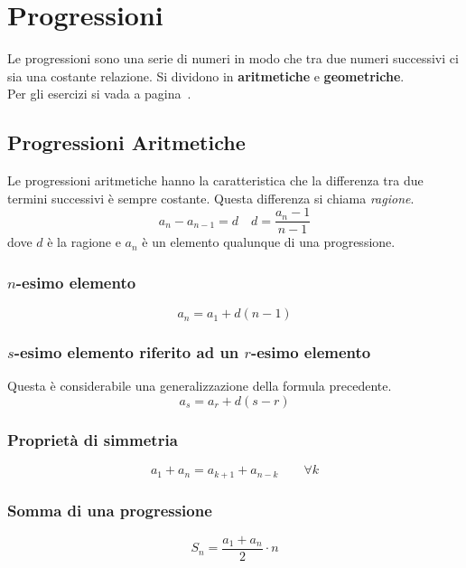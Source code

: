 
\section{Progressioni}\label{sec:progressioni}
Le progressioni sono una serie di numeri in modo che tra due numeri successivi ci sia una costante
relazione. Si dividono in \textbf{aritmetiche} e \textbf{geometriche}.\\
Per gli esercizi si vada a pagina~\pageref{ex:progressioni}.

\subsection{Progressioni Aritmetiche}
Le progressioni aritmetiche hanno la caratteristica che la differenza tra due termini successivi è
sempre costante. Questa differenza si chiama \emph{ragione}.
\begin{equation*}
a_n - a_{n-1} = d \quad d = \frac{a_n-1}{n-1}
\end{equation*}
dove $d$ è la ragione e $a_n$ è un elemento qualunque di una progressione.

\subsubsection{$n$-esimo elemento}
\begin{equation*}
a_n = a_1 + d(n-1)
\end{equation*}

\subsubsection{$s$-esimo elemento riferito ad un $r$-esimo elemento}
Questa è considerabile una generalizzazione della formula precedente.
\begin{equation*}
a_s = a_r + d(s-r)
\end{equation*}

\subsubsection{Proprietà di simmetria}
\begin{equation*}
a_1+a_n = a_{k+1}+a_{n-k}\qquad\forall k
\end{equation*}

\subsubsection{Somma di una progressione}
\begin{equation*}
S_n = \frac{a_1+a_n}{2}\cdot n
\end{equation*}

